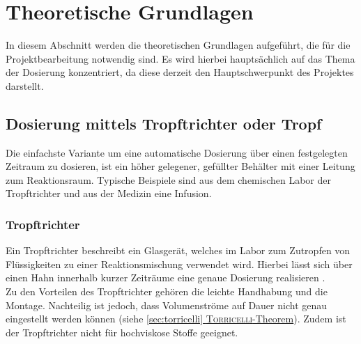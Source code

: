 \section{Theoretische Grundlagen}
\label{sec:physik}
In diesem Abschnitt werden die theoretischen Grundlagen aufgeführt, die für die Projektbearbeitung notwendig sind. Es wird hierbei hauptsächlich auf das Thema der Dosierung konzentriert, da diese derzeit den Hauptschwerpunkt des Projektes darstellt.

\subsection{Dosierung mittels Tropftrichter oder Tropf}
Die einfachste Variante um eine automatische Dosierung über einen festgelegten Zeitraum zu dosieren, ist ein höher gelegener, gefüllter Behälter mit einer Leitung zum Reaktionsraum. Typische Beispiele sind aus dem chemischen Labor der Tropftrichter und aus der Medizin eine Infusion. 

\subsubsection*{Tropftrichter}
Ein Tropftrichter beschreibt ein Glasgerät, welches im Labor zum Zutropfen von Flüssigkeiten zu einer Reaktionsmischung verwendet wird. Hierbei lässt sich über einen Hahn innerhalb kurzer Zeiträume eine genaue Dosierung realisieren \cite{Hunig.2006}.\\
Zu den Vorteilen des Tropftrichter gehören die leichte Handhabung und die Montage. Nachteilig ist jedoch, dass Volumenströme auf Dauer nicht genau eingestellt werden können (siehe \hyperref[sec:torricelli]{\ref{sec:torricelli} \textsc{Torricelli}-Theorem}). Zudem ist der Tropftrichter nicht für hochviskose Stoffe geeignet.

